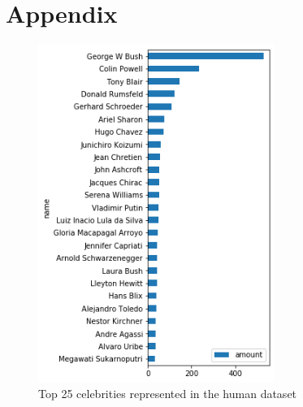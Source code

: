 \documentclass[paper=A4, DIV=10, parskip=half]{scrartcl}
\begin{document}
\newpage
\section*{Appendix}

\begin{figure}[H]
  \centering
  \includegraphics[height=11cm]{images/human_balance.png}
  \caption{Top 25 celebrities represented in the human dataset}
  \label{human_balance}
\end{figure}
\end{document}
